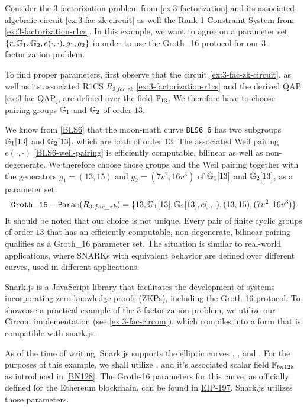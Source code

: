 \begin{example}
\label{ex:3-fac-groth-16-params} Consider the $3$-factorization problem from \ref{ex:3-factorization} and its associated algebraic circuit \ref{ex:3-fac-zk-circuit} as well the Rank-1 Constraint System from \ref{ex:3-factorization-r1cs}. In this example, we want to agree on a parameter set $\{r, \mathbb{G}_1, \mathbb{G}_2, e(\cdot,\cdot), g_1, g_2\}$ in order to use the Groth\_16 protocol for our $3$-factorization problem. 

To find proper parameters, first observe that the circuit \ref{ex:3-fac-zk-circuit}, as well as its associated R1CS $R_{3.fac\_zk}$ \ref{ex:3-factorization-r1cs} and the derived QAP \ref{ex:3-fac-QAP}, are defined over the field $\mathbb{F}_{13}$. We therefore have to choose pairing groups $\mathbb{G}_1$ and $\mathbb{G}_2$ of order $13$. 

We know from \ref{BLS6} that the moon-math curve \texttt{BLS6\_6} has two subgroups $\mathbb{G}_1[13]$ and $\mathbb{G}_2[13]$, which are both of order $13$. The associated Weil pairing $e(\cdot,\cdot)$ \ref{BLS6-weil-pairing} is efficiently computable, bilinear as well as non-degenerate. We therefore choose those groups and the Weil pairing together with the generators $g_1 = (13,15) $ and $g_2=(7v^2,16v^3)$ of $\mathbb{G}_1[13]$ and $\mathbb{G}_2[13]$, as a parameter set:
$$
\mathtt{Groth\_16-Param}(R_{3.fac\_zk})= \{ 13, \mathbb{G}_1[13], \mathbb{G}_2[13], e(\cdot,\cdot), (13,15),(7v^2,16v^3) \}
$$
It should be noted that our choice is not unique. Every pair of finite cyclic groups of order $13$ that has an efficiently computable, non-degenerate, bilinear pairing qualifies as a Groth\_16 parameter set. The situation is similar to real-world applications, where SNARKs with equivalent behavior are defined over different curves, used in different applications.
\end{example}
\begin{example}
\label{ex:3-fac-groth-16-params-circom} Snark.js is a JavaScript library that facilitates the development of systems incorporating zero-knowledge proofs (ZKPs), including the Groth-16 protocol. To showcase a practical example of the 3-factorization problem, we utilize our Circom implementation (see \ref{ex:3-fac-circom}), which compiles into a form that is compatible with snark.js.

As of the time of writing, Snark.js supports the elliptic curves , , and . For the purposes of this example, we shall utilize , and it's associated scalar field $\mathbb{F}_{bn128}$ as introduced in \ref{BN128}. The Groth-16 parameters for this curve, as officially defined for the Ethereum blockchain, can be found in \href{https://github.com/ethereum/EIPs/blob/master/EIPS/eip-197.md}{EIP-197}. Snark.js utilizes those parameters.
\end{example}
